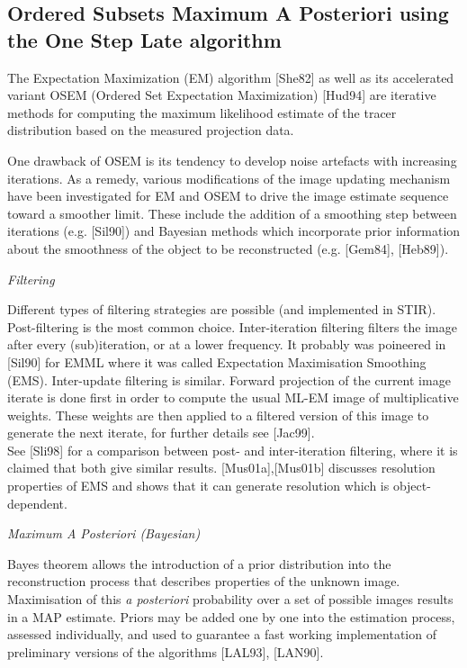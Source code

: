 \documentclass{article}
\begin{document}
\subsection{
Ordered Subsets Maximum A Posteriori using the One Step Late 
algorithm}

The Expectation Maximization (EM) algorithm [She82] as well as 
its accelerated variant OSEM (Ordered Set Expectation Maximization) 
[Hud94] are iterative methods for computing the maximum likelihood 
estimate of the tracer distribution based on the measured projection 
data.

One drawback of OSEM is its tendency to develop noise artefacts 
with increasing iterations. As a remedy, various modifications 
of the image updating mechanism have been investigated for EM 
and OSEM to drive the image estimate sequence toward a smoother 
limit. These include the addition of a smoothing step between 
iterations (e.g. [Sil90]) and Bayesian methods which incorporate 
prior information about the smoothness of the object to be reconstructed 
(e.g. [Gem84], [Heb89]).


\begin{spacing}{1.5}
\textit{Filtering}


\end{spacing}

Different types of filtering strategies are possible (and implemented 
in STIR). Post-filtering is the most common choice. Inter-iteration 
filtering filters the image after every (sub)iteration, or at 
a lower frequency. It probably was poineered in [Sil90] for EMML 
where it was called Expectation Maximisation Smoothing (EMS). 
Inter-update filtering is similar. Forward
projection of the current image iterate is done first in order to
compute the usual ML-EM image of multiplicative weights. These weights are
then applied to a filtered version of this image to generate the next
iterate, for further details see [Jac99].\\
See [Sli98] for a comparison between post- and inter-iteration 
filtering, where it is claimed that both give similar results. 
[Mus01a],[Mus01b] discusses resolution properties of EMS and 
shows that it can generate resolution which is object-dependent.



\begin{spacing}{1.5}
\textit{Maximum A Posteriori (Bayesian)}


\end{spacing}

Bayes theorem allows the introduction of a prior distribution 
into the reconstruction process that describes properties of 
the unknown image. Maximisation of this \textit{a posteriori} probability 
over a set of possible images results in a MAP estimate. Priors 
may be added one by one into the estimation process, assessed 
individually, and used to guarantee a fast working implementation 
of preliminary versions of the algorithms [LAL93], [LAN90].
\end{document}
